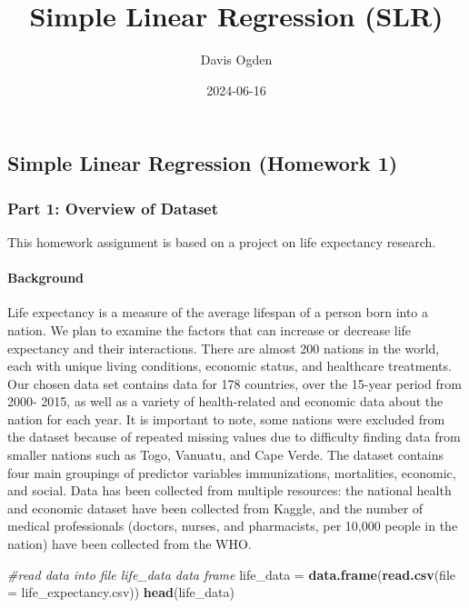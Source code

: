\documentclass[
]{article}
\title{Simple Linear Regression (SLR)}
\author{Davis Ogden}
\date{2024-06-16}
\newenvironment{Shaded}{\begin{snugshade}}{\end{snugshade}}
\newcommand{\AttributeTok}[1]{\textcolor[rgb]{0.13,0.29,0.53}{#1}}
\newcommand{\CommentTok}[1]{\textcolor[rgb]{0.56,0.35,0.01}{\textit{#1}}}
\newcommand{\FunctionTok}[1]{\textcolor[rgb]{0.13,0.29,0.53}{\textbf{#1}}}
\newcommand{\NormalTok}[1]{#1}
\newcommand{\OtherTok}[1]{\textcolor[rgb]{0.56,0.35,0.01}{#1}}
\newcommand{\StringTok}[1]{\textcolor[rgb]{0.31,0.60,0.02}{#1}}
\begin{document}
\maketitle

\subsection{Simple Linear Regression (Homework
1)}\label{simple-linear-regression-homework-1}

\subsubsection{Part 1: Overview of
Dataset}\label{part-1-overview-of-dataset}

This homework assignment is based on a project on life expectancy
research.

\paragraph{Background}\label{background}

Life expectancy is a measure of the average lifespan of a person born
into a nation. We plan to examine the factors that can increase or
decrease life expectancy and their interactions. There are almost 200
nations in the world, each with unique living conditions, economic
status, and healthcare treatments. Our chosen data set contains data for
178 countries, over the 15-year period from 2000- 2015, as well as a
variety of health-related and economic data about the nation for each
year. It is important to note, some nations were excluded from the
dataset because of repeated missing values due to difficulty finding
data from smaller nations such as Togo, Vanuatu, and Cape Verde. The
dataset contains four main groupings of predictor variables
immunizations, mortalities, economic, and social. Data has been
collected from multiple resources: the national health and economic
dataset have been collected from Kaggle, and the number of medical
professionals (doctors, nurses, and pharmacists, per 10,000 people in
the nation) have been collected from the WHO.

\begin{Shaded}
\begin{Highlighting}[]
\CommentTok{\#read data into file life\_data data frame}
\NormalTok{life\_data }\OtherTok{=} \FunctionTok{data.frame}\NormalTok{(}\FunctionTok{read.csv}\NormalTok{(}\AttributeTok{file =} \StringTok{\textquotesingle{}life\_expectancy.csv\textquotesingle{}}\NormalTok{))}
\FunctionTok{head}\NormalTok{(life\_data)}
\end{Highlighting}
\end{Shaded}
\end{document}
